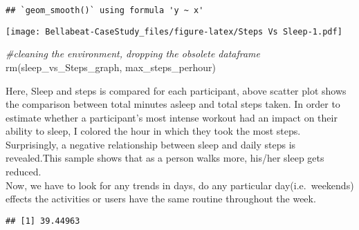 \documentclass[
]{article}
\newenvironment{Shaded}{\begin{snugshade}}{\end{snugshade}}
\newcommand{\CommentTok}[1]{\textcolor[rgb]{0.56,0.35,0.01}{\textit{#1}}}
\newcommand{\FunctionTok}[1]{\textcolor[rgb]{0.00,0.00,0.00}{#1}}
\newcommand{\NormalTok}[1]{#1}
\newcommand{\OtherTok}[1]{\textcolor[rgb]{0.56,0.35,0.01}{#1}}
\newcommand{\SpecialCharTok}[1]{\textcolor[rgb]{0.00,0.00,0.00}{#1}}
\begin{document}
\begin{verbatim}
## `geom_smooth()` using formula 'y ~ x'
\end{verbatim}

\texttt{[image: Bellabeat-CaseStudy\_files/figure-latex/Steps Vs Sleep-1.pdf]}

\begin{Shaded}
\begin{Highlighting}[]
  \CommentTok{\#cleaning the environment, dropping the obsolete dataframe}
   \FunctionTok{rm}\NormalTok{(sleep\_vs\_Steps\_graph, max\_steps\_perhour)}
\end{Highlighting}
\end{Shaded}

Here, Sleep and steps is compared for each participant, above scatter
plot shows the comparison between total minutes asleep and total steps
taken. In order to estimate whether a participant's most intense workout
had an impact on their ability to sleep, I colored the hour in which
they took the most steps. Surprisingly, a negative relationship between
sleep and daily steps is revealed.This sample shows that as a person
walks more, his/her sleep gets reduced.\\

Now, we have to look for any trends in days, do any particular
day(i.e.~weekends) effects the activities or users have the same routine
throughout the week.

\begin{Shaded}
\end{Shaded}

\begin{verbatim}
## [1] 39.44963
\end{verbatim}
\end{document}
